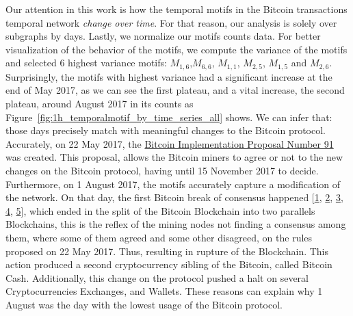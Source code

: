 \documentclass[../../thesis.tex]{subfiles}
\begin{document}
Our attention in this work is how the temporal motifs in the Bitcoin transactions temporal network \textit{change over time}. For that reason, our analysis is solely over subgraphs by days. Lastly, we normalize our motifs counts data. For better visualization of the behavior of the motifs, we compute the variance of the motifs and selected 6 highest variance motifs: $M_{1,6}$,$M_{6,6}$, $M_{1,1}$, $M_{2,5}$, $M_{1,5}$ and $M_{2,6}$. Surprisingly, the motifs with highest variance had a significant increase at the end of May 2017, as we can see the first plateau, and a vital increase, the second plateau, around August 2017 in its counts as Figure~\ref{fig:1h_temporalmotif_by_time_series_all} shows. We can infer that: those days precisely match with meaningful changes to the Bitcoin protocol. Accurately, on 22 May 2017, the \href{https://github.com/bitcoin/bips/blob/master/bip-0091.mediawiki}{Bitcoin Implementation Proposal Number 91} was created. This proposal, allows the Bitcoin miners to agree or not to the new changes on the Bitcoin protocol, having until 15 November 2017 to decide. Furthermore, on 1 August 2017, the motifs accurately capture a modification of the network. On that day, the first Bitcoin break of consensus happened [\href{https://www.cnbc.com/2017/07/31/blockchain-fork-will-create-new-digital-crypto-currency-bitcoin-cash.html}{1}, \href{https://www.theverge.com/2017/8/1/16075276/bitcoin-cash-hard-fork-coinbase}{2}, \href{https://motherboard.vice.com/en_us/article/9kwepa/bitcoin-has-forked}{3}, \href{https://techcrunch.com/2017/08/02/wtf-is-bitcoin-cash-and-is-it-worth-anything/}{4}, \href{http://money.cnn.com/2017/08/01/technology/business/bitcoin-cash-new-currency/index.html}{5}], which ended in the split of the Bitcoin Blockchain into two parallels Blockchains, this is the reflex of the mining nodes not finding a consensus among them, where some of them agreed and some other disagreed, on the rules proposed on 22 May 2017. Thus, resulting in rupture of the Blockchain. This action produced a second cryptocurrency sibling of the Bitcoin, called Bitcoin Cash. Additionally, this change on the protocol pushed a halt on several Cryptocurrencies Exchanges, and Wallets. These reasons can explain why 1 August was the day with the lowest usage of the Bitcoin protocol.
\end{document}
